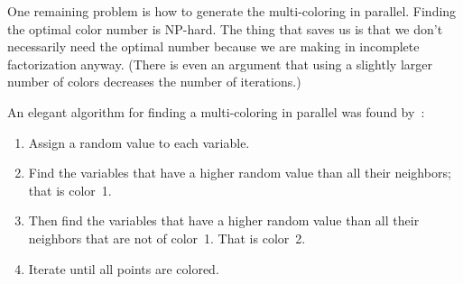 One remaining problem is how to generate the multi-coloring in
parallel. Finding the optimal color number is NP-hard. 
The thing that saves us is that we don't necessarily need the optimal
number because we are making in incomplete factorization
anyway. (There is even an argument that using a slightly larger number
of colors decreases the number of iterations.)

An elegant algorithm for finding a multi-coloring in parallel was
found by~\cite{jopl94,Luby:parallel}:
\begin{enumerate}
\item Assign a random value to each variable.
\item Find the variables that have a higher random value than all their
  neighbors; that is color~1.
\item Then find the variables that have a higher random value than all
  their neighbors that are not of color~1. That is color~2.
\item Iterate until all points are colored.
\end{enumerate}


